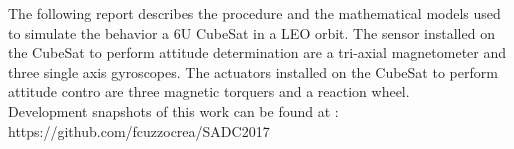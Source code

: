 The following report describes the procedure and the mathematical models used to simulate the behavior a 6U CubeSat in a LEO orbit.
The sensor installed on the CubeSat to perform attitude determination are a tri-axial magnetometer and three single axis gyroscopes. 
The actuators installed on the CubeSat to perform attitude contro are three magnetic torquers and a reaction wheel.\\
Development snapshots of this work can be found at : https://github.com/fcuzzocrea/SADC2017
